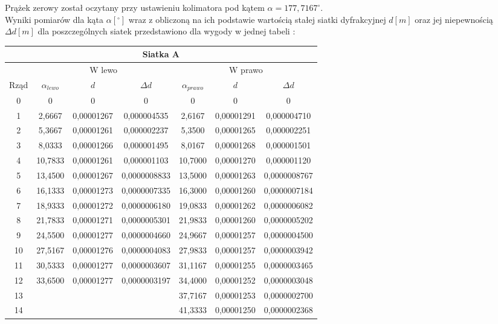 \documentclass[10pt,a4paper]{article}
\begin{document}
Prążek zerowy został oczytany przy ustawieniu kolimatora pod kątem $\alpha = 177,7167^{\circ}$.\\

Wyniki pomiarów dla kąta $\alpha[^\circ]$ wraz z obliczoną na ich podstawie wartością stałej siatki dyfrakcyjnej $d [m]$ oraz jej niepewnością $\Delta d [m]$ dla poszczególnych siatek przedstawiono dla wygody w jednej tabeli :

\begin{center}
\begin{tabular}{|c|c|c|c|c|c|c|}
\hline
\multicolumn{7}{|c|}{Siatka A}\\
\hline
& \multicolumn{3}{c}{W lewo} & \multicolumn{3}{|c|}{W prawo}\\
\hline
Rząd & $\alpha_{lewo}$ & $d$ &$\Delta d$ &$\alpha_{prawo}$&$d$&$\Delta d$\\
\hline
0&0&0&0&0&0&0\\ 
\hline
1&2,6667&0,00001267&0,000004535&2,6167&0,00001291&0,000004710\\ 
\hline 
2&5,3667&0,00001261&0,000002237&5,3500&0,00001265&0,000002251\\ 
\hline 
3&8,0333&0,00001266&0,000001495&8,0167&0,00001268&0,000001501\\ 
\hline 
4&10,7833&0,00001261&0,000001103&10,7000&0,00001270&0,000001120\\ 
\hline 
5&13,4500&0,00001267&0,0000008833&13,5000&0,00001263&0,0000008767\\ 
\hline 
6&16,1333&0,00001273&0,0000007335&16,3000&0,00001260&0,0000007184\\ 
\hline 
7&18,9333&0,00001272&0,0000006180&19,0833&0,00001262&0,0000006082\\ 
\hline 
8&21,7833&0,00001271&0,0000005301&21,9833&0,00001260&0,0000005202\\ 
\hline 
9&24,5500&0,00001277&0,0000004660&24,9667&0,00001257&0,0000004500\\ 
\hline 
10&27,5167&0,00001276&0,0000004083&27,9833&0,00001257&0,0000003942\\ 
\hline 
11&30,5333&0,00001277&0,0000003607&31,1167&0,00001255&0,0000003465\\ 
\hline 
12&33,6500&0,00001277&0,0000003197&34,4000&0,00001252&0,0000003048\\ 
\hline 
13&&&&37,7167&0,00001253&0,0000002700\\ 
\hline 
14&&&&41,3333&0,00001250&0,0000002368\\ 
\hline 
\end{tabular}
\end{center}
\end{document}
